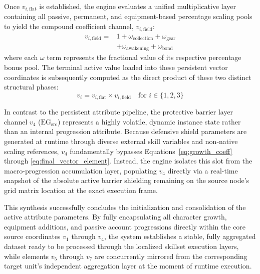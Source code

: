 \documentclass[twocolumn,10pt]{article}
\begin{document}
Once $v_{i,\text{flat}}$ is established, the engine evaluates a unified multiplicative layer containing all passive, permanent, and equipment-based percentage scaling pools to yield the compound coefficient channel, $v_{i,\text{field}}$:
\begin{equation}
\begin{split}
v_{i,\text{field}} = {} & 1 + \omega_{\text{collection}} + \omega_{\text{gear}} \\
& + \omega_{\text{awakening}} + \omega_{\text{bond}}
\end{split}
\label{eq:field_stat_construction}
\end{equation}
where each $\omega$ term represents the fractional value of its respective percentage bonus pool. The terminal active value loaded into these persistent vector coordinates is subsequently computed as the direct product of these two distinct structural phases:
\begin{equation}
v_i = v_{i,\text{flat}} \times v_{i,\text{field}} \quad \text{for } i \in \{1, 2, 3\}
\label{eq:final_vector_element}
\end{equation}

In contrast to the persistent attribute pipeline, the protective barrier layer channel $v_4$ ($\text{EG}_{\text{src}}$) represents a highly volatile, dynamic instance state rather than an internal progression attribute. Because defensive shield parameters are generated at runtime through diverse external skill variables and non-native scaling references, $v_4$ fundamentally bypasses Equations~\ref{eq:growth_coeff} through \ref{eq:final_vector_element}. Instead, the engine isolates this slot from the macro-progression accumulation layer, populating $v_4$ directly via a real-time snapshot of the absolute active barrier shielding remaining on the source node's grid matrix location at the exact execution frame.

This synthesis successfully concludes the initialization and consolidation of the active attribute parameters. By fully encapsulating all character growth, equipment additions, and passive account progressions directly within the core source coordinates $v_1$ through $v_4$, the system establishes a stable, fully aggregated dataset ready to be processed through the localized skillset execution layers, while elements $v_5$ through $v_7$ are concurrently mirrored from the corresponding target unit's independent aggregation layer at the moment of runtime execution.
\end{document}

